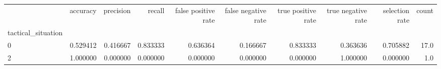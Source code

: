 \begin{tabular}{lrrrrrrrrr}
\toprule
{} &  accuracy &  precision &    recall &  false positive rate &  false negative rate &  true positive rate &  true negative rate &  selection rate &  count \\
tactical\_situation &           &            &           &                      &                      &                     &                     &                 &        \\
\midrule
0                  &  0.529412 &   0.416667 &  0.833333 &             0.636364 &             0.166667 &            0.833333 &            0.363636 &        0.705882 &   17.0 \\
2                  &  1.000000 &   0.000000 &  0.000000 &             0.000000 &             0.000000 &            0.000000 &            1.000000 &        0.000000 &    1.0 \\
\bottomrule
\end{tabular}
